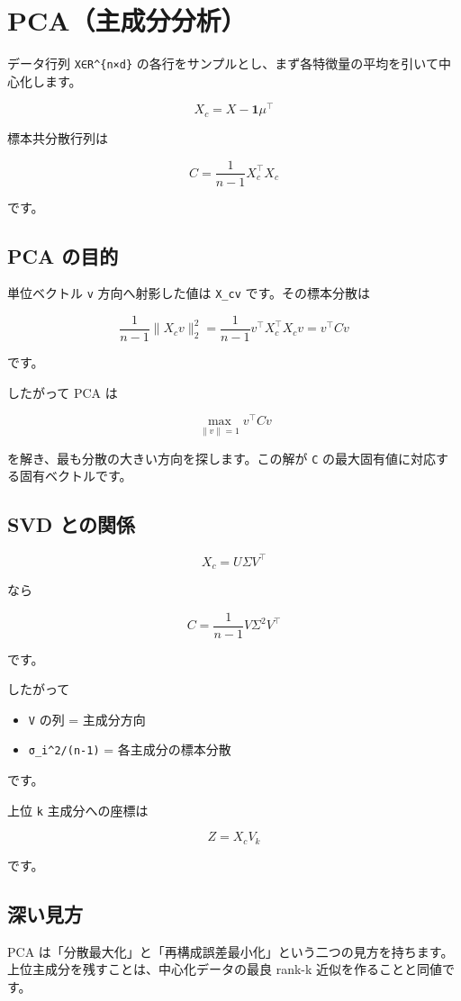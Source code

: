 \documentclass[
  11pt,
  a4paper,
]{ltjsarticle}
\author{}
\date{}
\providecommand{\tightlist}{%
  \setlength{\itemsep}{0pt}\setlength{\parskip}{0pt}}
\begin{document}
\hypertarget{pcaux4e3bux6210ux5206ux5206ux6790}{%
\section{PCA（主成分分析）}\label{pcaux4e3bux6210ux5206ux5206ux6790}}

データ行列 \texttt{X∈R\^{}\{n×d\}}
の各行をサンプルとし、まず各特徴量の平均を引いて中心化します。

\[
X_c=X-\mathbf{1}\mu^\top
\]

標本共分散行列は

\[
C=\frac{1}{n-1}X_c^\top X_c
\]

です。

\hypertarget{pca-ux306eux76eeux7684}{%
\subsection{PCA の目的}\label{pca-ux306eux76eeux7684}}

単位ベクトル \texttt{v} 方向へ射影した値は \texttt{X\_cv}
です。その標本分散は

\[
\frac{1}{n-1}\|X_cv\|_2^2
=\frac{1}{n-1}v^\top X_c^\top X_cv
=v^\top Cv
\]

です。

したがって PCA は

\[
\max_{\|v\|=1}v^\top Cv
\]

を解き、最も分散の大きい方向を探します。この解が \texttt{C}
の最大固有値に対応する固有ベクトルです。

\hypertarget{svd-ux3068ux306eux95a2ux4fc2}{%
\subsection{SVD との関係}\label{svd-ux3068ux306eux95a2ux4fc2}}

\[
X_c=U\Sigma V^\top
\]

なら

\[
C=\frac{1}{n-1}V\Sigma^2V^\top
\]

です。

したがって

\begin{itemize}
\tightlist
\item
  \texttt{V} の列 = 主成分方向
\item
  \texttt{σ\_i\^{}2/(n-1)} = 各主成分の標本分散
\end{itemize}

です。

上位 \texttt{k} 主成分への座標は

\[
Z=X_cV_k
\]

です。

\hypertarget{ux6df1ux3044ux898bux65b9}{%
\subsection{深い見方}\label{ux6df1ux3044ux898bux65b9}}

PCA
は「分散最大化」と「再構成誤差最小化」という二つの見方を持ちます。上位主成分を残すことは、中心化データの最良
rank-k 近似を作ることと同値です。
\end{document}
